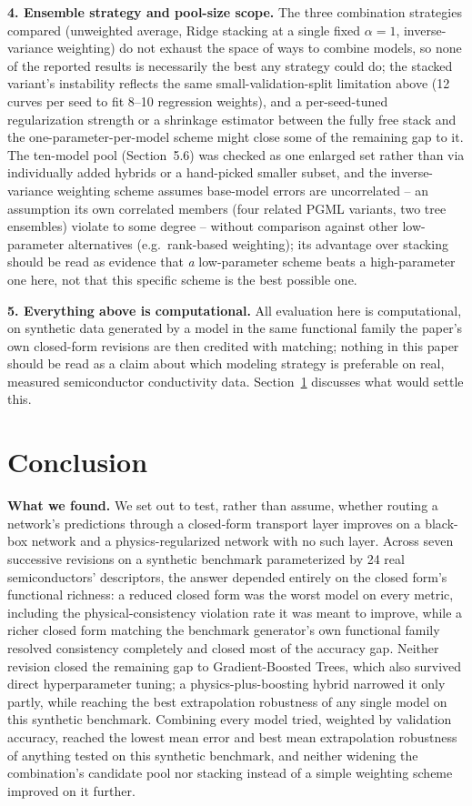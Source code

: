 \documentclass[11pt]{article}
\begin{document}
\textbf{4. Ensemble strategy and pool-size scope.} The three combination strategies compared (unweighted average, Ridge stacking at a single fixed $\alpha=1$, inverse-variance weighting) do not exhaust the space of ways to combine models, so none of the reported results is necessarily the best any strategy could do; the stacked variant's instability reflects the same small-validation-split limitation above (12 curves per seed to fit 8--10 regression weights), and a per-seed-tuned regularization strength or a shrinkage estimator between the fully free stack and the one-parameter-per-model scheme might close some of the remaining gap to it. The ten-model pool (Section~5.6) was checked as one enlarged set rather than via individually added hybrids or a hand-picked smaller subset, and the inverse-variance weighting scheme assumes base-model errors are uncorrelated -- an assumption its own correlated members (four related PGML variants, two tree ensembles) violate to some degree -- without comparison against other low-parameter alternatives (e.g.\ rank-based weighting); its advantage over stacking should be read as evidence that \emph{a} low-parameter scheme beats a high-parameter one here, not that this specific scheme is the best possible one.

\textbf{5. Everything above is computational.} All evaluation here is computational, on synthetic data generated by a model in the same functional family the paper's own closed-form revisions are then credited with matching; nothing in this paper should be read as a claim about which modeling strategy is preferable on real, measured semiconductor conductivity data. Section~\ref{sec:conclusion} discusses what would settle this.

\section{Conclusion}
\label{sec:conclusion}

\textbf{What we found.} We set out to test, rather than assume, whether routing a network's predictions through a closed-form transport layer improves on a black-box network and a physics-regularized network with no such layer. Across seven successive revisions on a synthetic benchmark parameterized by 24 real semiconductors' descriptors, the answer depended entirely on the closed form's functional richness: a reduced closed form was the worst model on every metric, including the physical-consistency violation rate it was meant to improve, while a richer closed form matching the benchmark generator's own functional family resolved consistency completely and closed most of the accuracy gap. Neither revision closed the remaining gap to Gradient-Boosted Trees, which also survived direct hyperparameter tuning; a physics-plus-boosting hybrid narrowed it only partly, while reaching the best extrapolation robustness of any single model on this synthetic benchmark. Combining every model tried, weighted by validation accuracy, reached the lowest mean error and best mean extrapolation robustness of anything tested on this synthetic benchmark, and neither widening the combination's candidate pool nor stacking instead of a simple weighting scheme improved on it further.
\end{document}
